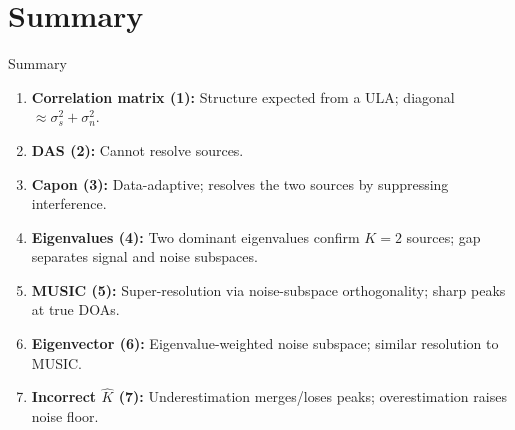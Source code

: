 \documentclass[aspectratio=169,9pt]{beamer}
\begin{document}
\section*{Summary}

\begin{frame}{Summary}
\begin{enumerate}\setlength\itemsep{3pt}
  \item \textbf{Correlation matrix (1):} Structure expected from a ULA; diagonal $\approx \sigma_s^2 + \sigma_n^2$.
  \item \textbf{DAS (2):} Cannot resolve sources.
  \item \textbf{Capon (3):} Data-adaptive; resolves the two sources by suppressing interference.
  \item \textbf{Eigenvalues (4):} Two dominant eigenvalues confirm $K\!=\!2$ sources; gap separates signal and noise subspaces.
  \item \textbf{MUSIC (5):} Super-resolution via noise-subspace orthogonality; sharp peaks at true DOAs.
  \item \textbf{Eigenvector (6):} Eigenvalue-weighted noise subspace; similar resolution to MUSIC.
  \item \textbf{Incorrect $\hat{K}$ (7):} Underestimation merges/loses peaks; overestimation raises noise floor.
\end{enumerate}
\end{frame}
\end{document}
